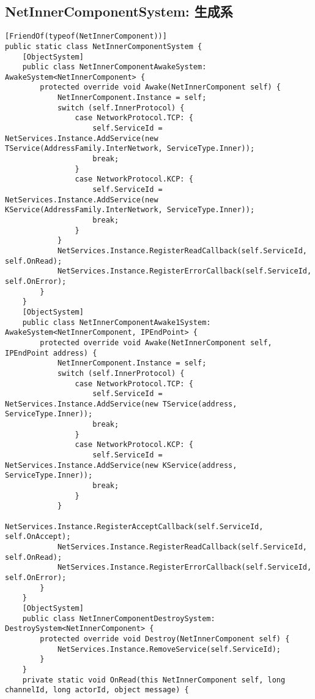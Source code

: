 \documentclass[9pt, b5paper]{article}
\begin{document}
\subsection{NetInnerComponentSystem: 生成系}
\label{sec:org4074cf1}
\begin{verbatim}
[FriendOf(typeof(NetInnerComponent))]
public static class NetInnerComponentSystem {
    [ObjectSystem]
    public class NetInnerComponentAwakeSystem: AwakeSystem<NetInnerComponent> {
        protected override void Awake(NetInnerComponent self) {
            NetInnerComponent.Instance = self;
            switch (self.InnerProtocol) {
                case NetworkProtocol.TCP: {
                    self.ServiceId = NetServices.Instance.AddService(new TService(AddressFamily.InterNetwork, ServiceType.Inner));
                    break;
                }
                case NetworkProtocol.KCP: {
                    self.ServiceId = NetServices.Instance.AddService(new KService(AddressFamily.InterNetwork, ServiceType.Inner));
                    break;
                }
            }
            NetServices.Instance.RegisterReadCallback(self.ServiceId, self.OnRead);
            NetServices.Instance.RegisterErrorCallback(self.ServiceId, self.OnError);
        }
    }
    [ObjectSystem]
    public class NetInnerComponentAwake1System: AwakeSystem<NetInnerComponent, IPEndPoint> {
        protected override void Awake(NetInnerComponent self, IPEndPoint address) {
            NetInnerComponent.Instance = self;
            switch (self.InnerProtocol) {
                case NetworkProtocol.TCP: {
                    self.ServiceId = NetServices.Instance.AddService(new TService(address, ServiceType.Inner));
                    break;
                }
                case NetworkProtocol.KCP: {
                    self.ServiceId = NetServices.Instance.AddService(new KService(address, ServiceType.Inner));
                    break;
                }
            }
            NetServices.Instance.RegisterAcceptCallback(self.ServiceId, self.OnAccept);
            NetServices.Instance.RegisterReadCallback(self.ServiceId, self.OnRead);
            NetServices.Instance.RegisterErrorCallback(self.ServiceId, self.OnError);
        }
    }
    [ObjectSystem]
    public class NetInnerComponentDestroySystem: DestroySystem<NetInnerComponent> {
        protected override void Destroy(NetInnerComponent self) {
            NetServices.Instance.RemoveService(self.ServiceId);
        }
    }
    private static void OnRead(this NetInnerComponent self, long channelId, long actorId, object message) {

\end{verbatim}
\end{document}

